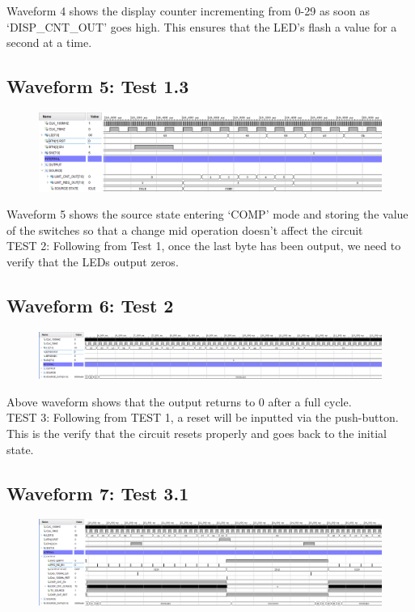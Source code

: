 \documentclass[11pt]{report}
\begin{document}
Waveform 4 shows the display counter incrementing from 0-29 as soon as `DISP\_CNT\_OUT' goes high. This ensures that the
LED's flash a value for a second at a time.

\subsection*{Waveform 5: Test 1.3 }
\begin{figure}[H]
       \includegraphics[width=\columnwidth]{Assets/Test1_3.png}
\end{figure}

Waveform 5 shows the source state entering `COMP' mode and storing the value of the switches so that a change mid 
operation doesn't affect the circuit\\

TEST 2: Following from Test 1, once the last byte has been output, we need to verify that the LEDs output zeros.

\subsection*{Waveform 6: Test 2 }
\begin{figure}[H]
       \includegraphics[width=\columnwidth]{Assets/Test2.png}
\end{figure}

Above waveform shows that the output returns to 0 after a full cycle.\\

TEST 3: Following from TEST 1, a reset will be inputted via the push-button. This is the verify that the circuit resets
properly and goes back to the initial state.

\subsection*{Waveform 7: Test 3.1 }
\begin{figure}[H]
       \includegraphics[width=\columnwidth]{Assets/Test3_1.png}
\end{figure}
\end{document}
